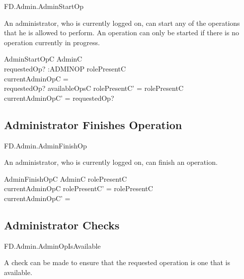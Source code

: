 \begin{traceunit}{FD.Admin.AdminStartOp}
\end{traceunit}

An administrator, who is currently logged on, can start any of the
operations that he is allowed to perform. An operation can only be
started if there is no operation currently in progress.

\begin{schema}{AdminStartOpC}
        \Delta AdminC
\\      requestedOp? :ADMINOP
\where
        rolePresentC \neq \Nil
\\      currentAdminOpC = \Nil
\\      requestedOp? \in  availableOpsC 
\also
        rolePresentC' = rolePresentC
\\      \The currentAdminOpC' = requestedOp?
\end{schema}

\subsection{Administrator Finishes Operation}

\begin{traceunit}{FD.Admin.AdminFinishOp}
\end{traceunit}

An administrator, who is currently logged on, can finish an operation.

\begin{schema}{AdminFinishOpC}
        \Delta AdminC
\where
        rolePresentC \neq \Nil
\\      currentAdminOpC \neq \Nil
\also
        rolePresentC' = rolePresentC
\\      currentAdminOpC' = \Nil 
\end{schema}



\subsection{Administrator Checks}

\begin{traceunit}{FD.Admin.AdminOpIsAvailable}
\end{traceunit}

A check can be made to ensure that the requested operation is one that
is available.

